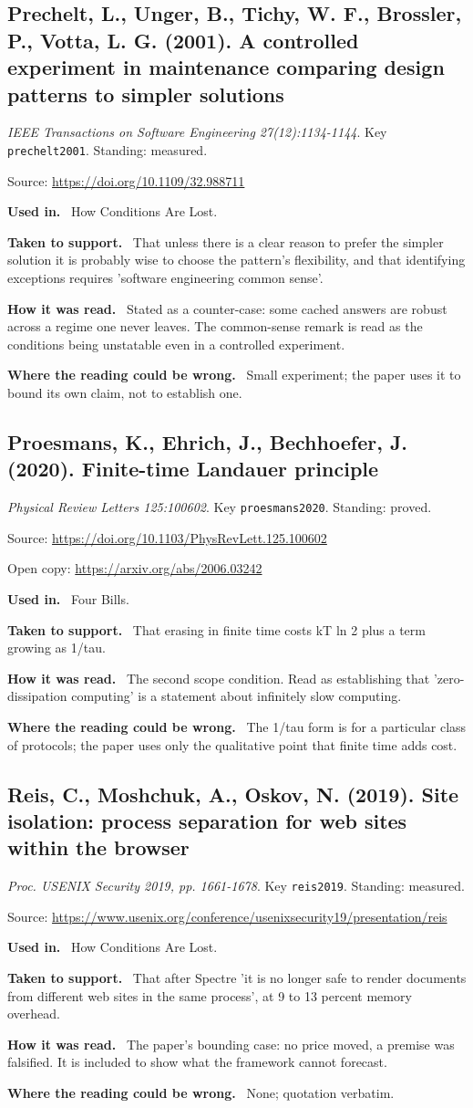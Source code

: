 \documentclass[11pt,oneside]{article}
\newcommand{\field}[1]{\par\noindent\textbf{\color{accent}#1.}\ }
\begin{document}
\subsection*{Prechelt, L., Unger, B., Tichy, W. F., Brossler, P., Votta, L. G. (2001). A controlled experiment in maintenance comparing design patterns to simpler solutions}
\noindent\small\emph{IEEE Transactions on Software Engineering 27(12):1134-1144}. Key \texttt{prechelt2001}. Standing: measured.
\par\noindent\small Source: \url{https://doi.org/10.1109/32.988711}
\normalsize
\field{Used in} How Conditions Are Lost.
\field{Taken to support} That unless there is a clear reason to prefer the simpler solution it is probably wise to choose the pattern's flexibility, and that identifying exceptions requires 'software engineering common sense'.
\field{How it was read} Stated as a counter-case: some cached answers are robust across a regime one never leaves. The common-sense remark is read as the conditions being unstatable even in a controlled experiment.
\field{Where the reading could be wrong} Small experiment; the paper uses it to bound its own claim, not to establish one.

\hypertarget{src:proesmans2020}{}
\subsection*{Proesmans, K., Ehrich, J., Bechhoefer, J. (2020). Finite-time Landauer principle}
\noindent\small\emph{Physical Review Letters 125:100602}. Key \texttt{proesmans2020}. Standing: proved.
\par\noindent\small Source: \url{https://doi.org/10.1103/PhysRevLett.125.100602}
\par\noindent\small Open copy: \url{https://arxiv.org/abs/2006.03242}
\normalsize
\field{Used in} Four Bills.
\field{Taken to support} That erasing in finite time costs kT ln 2 plus a term growing as 1/tau.
\field{How it was read} The second scope condition. Read as establishing that 'zero-dissipation computing' is a statement about infinitely slow computing.
\field{Where the reading could be wrong} The 1/tau form is for a particular class of protocols; the paper uses only the qualitative point that finite time adds cost.

\hypertarget{src:reis2019}{}
\subsection*{Reis, C., Moshchuk, A., Oskov, N. (2019). Site isolation: process separation for web sites within the browser}
\noindent\small\emph{Proc. USENIX Security 2019, pp. 1661-1678}. Key \texttt{reis2019}. Standing: measured.
\par\noindent\small Source: \url{https://www.usenix.org/conference/usenixsecurity19/presentation/reis}
\normalsize
\field{Used in} How Conditions Are Lost.
\field{Taken to support} That after Spectre 'it is no longer safe to render documents from different web sites in the same process', at 9 to 13 percent memory overhead.
\field{How it was read} The paper's bounding case: no price moved, a premise was falsified. It is included to show what the framework cannot forecast.
\field{Where the reading could be wrong} None; quotation verbatim.
\end{document}
